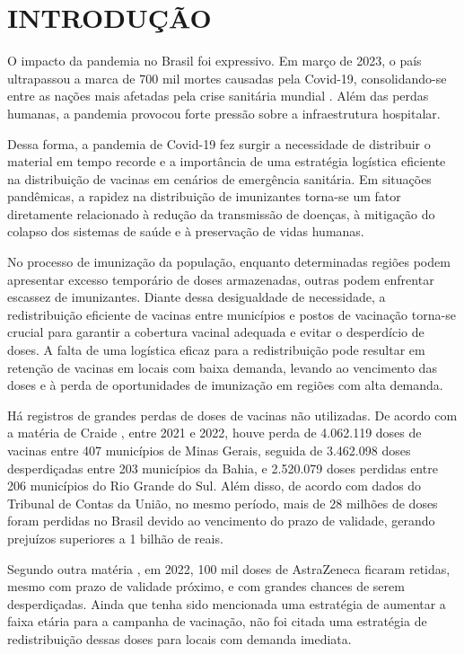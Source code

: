 \chapter{INTRODUÇÃO}

O impacto da pandemia no Brasil foi expressivo. Em março de 2023, o país ultrapassou a marca de 700 mil mortes causadas pela Covid-19, consolidando-se entre as nações mais afetadas pela crise sanitária mundial \cite{MS:2023}. Além das perdas humanas, a pandemia provocou forte pressão sobre a infraestrutura hospitalar.

Dessa forma, a pandemia de Covid-19 fez surgir a necessidade de distribuir o material em tempo recorde e a importância de uma estratégia logística eficiente na distribuição de vacinas em cenários de emergência sanitária. Em situações pandêmicas, a rapidez na distribuição de imunizantes torna-se um fator diretamente relacionado à redução da transmissão de doenças, à mitigação do colapso dos sistemas de saúde e à preservação de vidas humanas.

No processo de imunização da população, enquanto determinadas regiões podem apresentar excesso temporário de doses armazenadas, outras podem enfrentar escassez de imunizantes. Diante dessa desigualdade de necessidade, a redistribuição eficiente de vacinas entre municípios e postos de vacinação torna-se crucial para garantir a cobertura vacinal adequada e evitar o desperdício de doses. A falta de uma logística eficaz para a redistribuição pode resultar em retenção de vacinas em locais com baixa demanda, levando ao vencimento das doses e à perda de oportunidades de imunização em regiões com alta demanda.

Há registros de grandes perdas de doses de vacinas não utilizadas. De acordo com a matéria de Craide \cite{art:CRAIDE}, entre 2021 e 2022, houve perda de 4.062.119 doses de vacinas entre 407 municípios de Minas Gerais, seguida de 3.462.098 doses desperdiçadas entre 203 municípios da Bahia, e 2.520.079 doses perdidas entre 206 municípios do Rio Grande do Sul. Além disso, de acordo com dados do Tribunal de Contas da União, no mesmo período, mais de 28 milhões de doses foram perdidas no Brasil devido ao vencimento do prazo de validade, gerando prejuízos superiores a 1 bilhão de reais. 

Segundo outra matéria \cite{art:BRASILDEFATO}, em 2022, 100 mil doses de AstraZeneca ficaram retidas, mesmo com prazo de validade próximo, e com grandes chances de serem desperdiçadas. Ainda que tenha sido mencionada uma estratégia de aumentar a faixa etária para a campanha de vacinação, não foi citada uma estratégia de redistribuição dessas doses para locais com demanda imediata.

